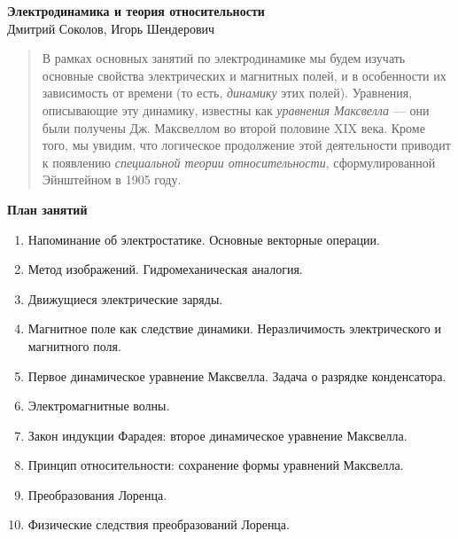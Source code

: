 \documentclass[11pt]{article}
\begin{document}
\begin{center}
  \LARGE{\textbf{Электродинамика и теория относительности}}\\[1cm]
  \Large{Дмитрий Соколов, Игорь Шендерович}\\[1cm]
\end{center}

\begin{abstract}
  В рамках основных занятий по электродинамике мы будем изучать
  основные свойства электрических и магнитных полей, и в особенности
  их зависимость от времени (то есть, \textit{динамику} этих
  полей). Уравнения, описывающие эту динамику, известны как
  \textit{уравнения Максвелла} — они были получены Дж. Максвеллом во
  второй половине XIX века. Кроме того, мы увидим, что логическое
  продолжение этой деятельности приводит к появлению
  \textit{специальной теории относительности}, сформулированной
  Эйнштейном в 1905 году.
\end{abstract}

\begin{center}
  \Large{\textbf{План занятий}}
\end{center}

\begin{enumerate}
\item Напоминание об электростатике. Основные векторные операции.
\item Метод изображений. Гидромеханическая аналогия.
\item Движущиеся электрические заряды.
\item Магнитное поле как следствие динамики. Неразличимость
  электрического и магнитного поля. 
\item Первое динамическое уравнение Максвелла. Задача о разрядке
  конденсатора. 
\item Электромагнитные волны.
\item Закон индукции Фарадея: второе динамическое уравнение
  Максвелла.
\item Принцип относительности: сохранение формы уравнений Максвелла. 
\item Преобразования Лоренца.
\item Физические следствия преобразований Лоренца. 
\end{enumerate}
\end{document}
